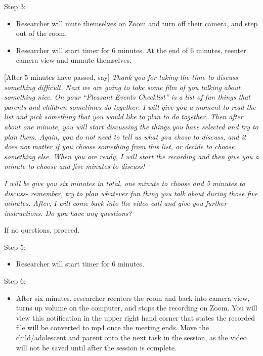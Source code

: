 \documentclass[]{book}
\providecommand{\tightlist}{%
  \setlength{\itemsep}{0pt}\setlength{\parskip}{0pt}}
\begin{document}
Step 3:

\begin{itemize}
\item
  Researcher will mute themselves on Zoom and turn off their camera, and step out of the room.
\item
  Researcher will start timer for 6 minutes. At the end of 6 minutes, reenter camera view and unmute themselves.
\end{itemize}

{[}After 5 minutes have passed, say{]} \emph{Thank you for taking the time to discuss something difficult. Next we are going to take some film of you talking about something nice. On your ``Pleasant Events Checklist'' is a list of fun things that parents and children sometimes do together. I will give you a moment to read the list and pick something that you would like to plan to do together. Then after about one minute, you will start discussing the things you have selected and try to plan them. Again, you do not need to tell us what you chose to discuss, and it does not matter if you choose something from this list, or decide to choose something else. When you are ready, I will start the recording and then give you a minute to choose and five minutes to discuss!}

\emph{I will be give you six minutes in total, one minute to choose and 5 minutes to discuss- remember, try to plan whatever fun thing you talk about during those five minutes. After, I will come back into the video call and give you further instructions. Do you have any questions?}

If no questions, proceed.

Step 5:

\begin{itemize}
\tightlist
\item
  Researcher will start timer for 6 minutes.
\end{itemize}

Step 6:

\begin{itemize}
\tightlist
\item
  After six minutes, researcher reenters the room and back into camera view, turns up volume on the computer, and stops the recording on Zoom. You will view this notification in the upper right hand corner that states the recorded file will be converted to mp4 once the meeting ends. Move the child/adolescent and parent onto the next task in the session, as the video will not be saved until after the session is complete.
\end{itemize}
\end{document}
